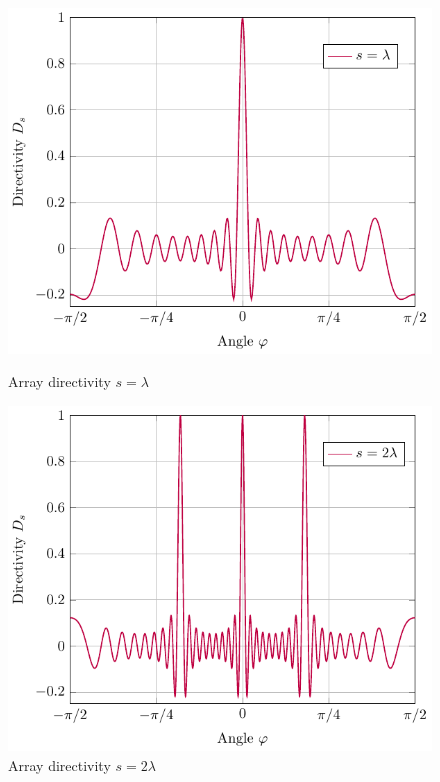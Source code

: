 \begin{figure}
    \begin{minipage}{0.49\textwidth}
    \centering
    \includegraphics[width=\textwidth]{images/3_Parametric_array/Directivity_NoSteer_Lambda.pdf}
    \caption{Array directivity $s = \lambda$}
    \label{3_subfig:directivity_no_steer_lambda}
    \end{minipage}
    \begin{minipage}{0.49\textwidth}
    \centering
    \includegraphics[width=\textwidth]{images/3_Parametric_array/Directivity_NoSteer_2Lambda.pdf}
    \caption{Array directivity $s = 2\lambda$}
     \label{3_subfig:directivity_no_steer_2lambda}
    \end{minipage}
\end{figure}

